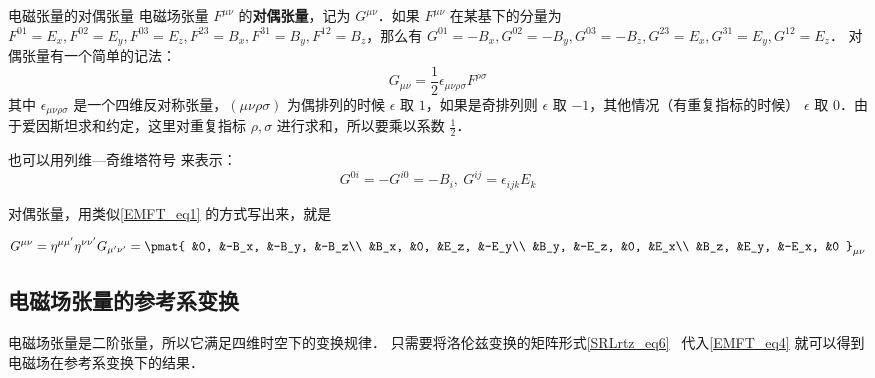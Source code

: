 \begin{definition}{电磁张量的对偶张量}
电磁场张量 $F^{\mu\nu}$ 的\textbf{对偶张量}，记为 $G^{\mu\nu}$．如果 $F^{\mu\nu}$ 在某基下的分量为 $F^{01}=E_x, F^{02}=E_y, F^{03}=E_z, F^{23}=B_x, F^{31}=B_y, F^{12}=B_z$，那么有 $G^{01}=-B_x, G^{02}=-B_y, G^{03}=-B_z, G^{23}=E_x, G^{31}=E_y, G^{12}=E_z$．
对偶张量有一个简单的记法：
\begin{equation}
G_{\mu\nu}=\frac{1}{2}\epsilon_{\mu\nu\rho\sigma}F^{\rho\sigma}
\end{equation}
其中 $\epsilon_{\mu\nu\rho\sigma}$ 是一个四维反对称张量，$(\mu\nu\rho\sigma)$ 为偶排列的时候 $\epsilon$ 取 $1$，如果是奇排列则 $\epsilon$ 取 $-1$，其他情况（有重复指标的时候） $\epsilon$ 取 $0$．由于爱因斯坦求和约定，这里对重复指标 $\rho,\sigma$ 进行求和，所以要乘以系数 $\frac{1}{2}$．

也可以用列维—奇维塔符号 来表示：
\begin{equation}
G^{0i}=-G^{i0}=-B_i,\ G^{ij}=\epsilon_{ijk}E_k
\end{equation}
\end{definition}

对偶张量，用类似\autoref{EMFT_eq1} 的方式写出来，就是

\begin{equation}
\begin{aligned}
G^{\mu\nu}=\eta^{\mu\mu'}\eta^{\nu\nu'}G_{\mu'\nu'}=
\pmat{
&0, &-B_x, &-B_y, &-B_z\\ 
&B_x, &0, &E_z, &-E_y\\ 
&B_y, &-E_z, &0, &E_x\\
&B_z, &E_y, &-E_x, &0
}_{\mu\nu}
\end{aligned}
\end{equation}

\subsection{电磁场张量的参考系变换}
电磁场张量是二阶张量，所以它满足四维时空下的变换规律．
只需要将洛伦兹变换的矩阵形式\autoref{SRLrtz_eq6}~ 代入\autoref{EMFT_eq4} 就可以得到电磁场在参考系变换下的结果．

